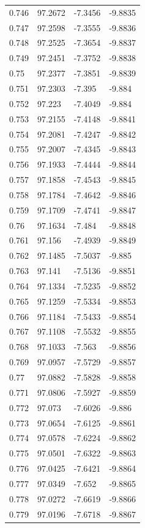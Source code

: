 \begin{tabular}{llll}
0.746 & 97.2672 & -7.3456 & -9.8835 \\
0.747 & 97.2598 & -7.3555 & -9.8836 \\
0.748 & 97.2525 & -7.3654 & -9.8837 \\
0.749 & 97.2451 & -7.3752 & -9.8838 \\
0.75 & 97.2377 & -7.3851 & -9.8839 \\
0.751 & 97.2303 & -7.395 & -9.884 \\
0.752 & 97.223 & -7.4049 & -9.884 \\
0.753 & 97.2155 & -7.4148 & -9.8841 \\
0.754 & 97.2081 & -7.4247 & -9.8842 \\
0.755 & 97.2007 & -7.4345 & -9.8843 \\
0.756 & 97.1933 & -7.4444 & -9.8844 \\
0.757 & 97.1858 & -7.4543 & -9.8845 \\
0.758 & 97.1784 & -7.4642 & -9.8846 \\
0.759 & 97.1709 & -7.4741 & -9.8847 \\
0.76 & 97.1634 & -7.484 & -9.8848 \\
0.761 & 97.156 & -7.4939 & -9.8849 \\
0.762 & 97.1485 & -7.5037 & -9.885 \\
0.763 & 97.141 & -7.5136 & -9.8851 \\
0.764 & 97.1334 & -7.5235 & -9.8852 \\
0.765 & 97.1259 & -7.5334 & -9.8853 \\
0.766 & 97.1184 & -7.5433 & -9.8854 \\
0.767 & 97.1108 & -7.5532 & -9.8855 \\
0.768 & 97.1033 & -7.563 & -9.8856 \\
0.769 & 97.0957 & -7.5729 & -9.8857 \\
0.77 & 97.0882 & -7.5828 & -9.8858 \\
0.771 & 97.0806 & -7.5927 & -9.8859 \\
0.772 & 97.073 & -7.6026 & -9.886 \\
0.773 & 97.0654 & -7.6125 & -9.8861 \\
0.774 & 97.0578 & -7.6224 & -9.8862 \\
0.775 & 97.0501 & -7.6322 & -9.8863 \\
0.776 & 97.0425 & -7.6421 & -9.8864 \\
0.777 & 97.0349 & -7.652 & -9.8865 \\
0.778 & 97.0272 & -7.6619 & -9.8866 \\
0.779 & 97.0196 & -7.6718 & -9.8867 \\

\end{tabular}
